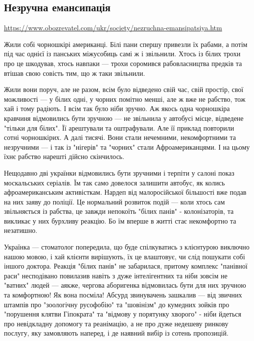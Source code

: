  
 

\subsection{Незручна емансипація}
\label{sec:08_02_2020.news.ua.obozrevatel.1.evgen_dykyy.emancipacia}

\url{https://www.obozrevatel.com/ukr/society/nezruchna-emansipatsiya.htm}

Жили собі чорношкірі американці. Білі пани спершу привезли їх рабами, а потім
під час однієї із панських міжусобиць самі ж і звільнили. Хтось із білих трохи
про це шкодував, хтось навпаки --- трохи соромився рабовласництва предків та
втішав свою совість тим, що ж таки звільнили.

Жили вони поруч, але не разом, всім було відведено свій час, свій простір, свої
можливості --- у білих одні, у чорних помітно менші, але ж вже не рабство, тож
хай і тому радіють. І всім так було ніби зручно. Аж якось одна чорношкіра
кравчиня відмовились бути зручною --- не звільнила у автобусі місце, відведене
"тільки для білих". Її арештували та оштрафували. Але її приклад повторили
сотні чорношкірих. А далі тисячі. Вони стали нечемними, некомфортними та
незручними --- і так із "нігерів" та "чорних" стали Афроамериканцями. І на цьому
їхнє рабство нарешті дійсно скінчилось.

Нещодавно дві українки відмовились бути зручними і терпіти у салоні показ
москальських серіалів. Їм так само довелося залишити автобус, як колись
афроамериканським активісткам. Нардеп від малоросійської більшості вже подав на
них заяву до поліції. Це нормальний розвиток подій --- коли хтось сам
звільняється із рабства, це завжди непокоїть "білих панів" - колонізаторів, та
викликає у них бурхливу реакцію. Бо їм вперше в житті стає некомфортно та
незатишно.

Українка --- стоматолог попередила, що буде спілкуватись з клієнтурою виключно
нашою мовою, і хай клієнти вирішують, їх це влаштовує, чи слід пошукати собі
іншого доктора. Реакція "білих панів" не забарилася, притому комплекс "панівної
раси" несподівано повилазив навіть з дуже інтелігентних та ніби зовсім не
"ватних" людей --- аякже, чергова аборигенка відмовилась бути для них зручною та
комфортною! Як вона посміла! Абсурд звинувачень зашкалив --- від звичних штампів
про "зоологічну русофобію" та "шовінізм" до кумедних зойків про "порушення
клятви Гіпократа" та "відмову у порятунку хворого" - ніби йдеться про
невідкладну допомогу та реанімацію, а не про дуже недешеву ринкову послугу, яку
замовляють наперед, і де наявний вибір із сотень пропозицій.

